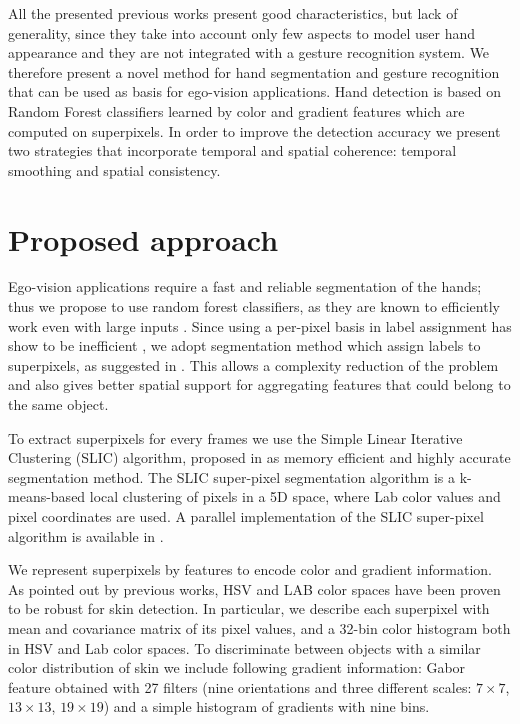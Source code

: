 All the presented previous works present good characteristics, but lack of generality, since they take into account only few aspects to model user hand appearance and they are not integrated with a gesture recognition system. We therefore present a novel method for hand segmentation and gesture recognition that can be used as basis for ego-vision applications. 
Hand detection is based on Random Forest classifiers learned by color and gradient features which are computed on superpixels. In order to improve the detection accuracy we present two strategies that incorporate temporal and spatial coherence: temporal smoothing and spatial consistency.

\section{Proposed approach}
Ego-vision applications require a fast and reliable segmentation of the hands; thus we propose to use random forest classifiers, as they are known to efficiently work even with large inputs \cite{leo01}. Since using a per-pixel basis in label assignment has show to be inefficient \cite{jones99}, we adopt segmentation method which assign labels to superpixels, as suggested in \cite{tighe13}. 
This allows a complexity reduction of the problem and also gives better spatial support for aggregating features that could belong to the same object. 

To extract superpixels for every frames we use the Simple Linear Iterative Clustering (SLIC) algorithm, proposed in \cite{achanta12} as memory efficient and highly accurate segmentation method. 
The SLIC super-pixel segmentation algorithm is a k-means-based local clustering of pixels in a 5D space, where Lab color values and pixel coordinates are used. A parallel implementation of the SLIC super-pixel algorithm is available in \cite{YHRengSLIC}. 

We represent superpixels by features to encode color and gradient information. As pointed out by previous works, HSV and LAB color spaces have been proven to be robust for skin detection. 
In particular, we describe each superpixel with mean and covariance matrix of its pixel values, and a 32-bin color histogram both in HSV and Lab color spaces.
To discriminate between objects with a similar color distribution of skin we include following gradient information: Gabor feature obtained with 27 filters (nine orientations and three different scales: $7 \times 7$, $13 \times 13$, $19 \times 19$) and a simple histogram of gradients with nine bins. 

